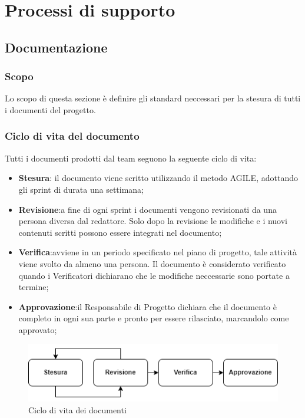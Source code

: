 \section{Processi di supporto}

\subsection{Documentazione}

\subsubsection{Scopo}
Lo scopo di questa sezione è definire gli standard neccessari per la stesura di tutti i documenti del progetto.

\subsubsection{Ciclo di vita del documento}
Tutti i documenti prodotti dal team seguono la seguente ciclo di vita:
\begin{itemize}
    \item \textbf{Stesura}: il documento viene scritto utilizzando il metodo AGILE, adottando gli sprint di durata una settimana; 
    \item \textbf{Revisione}:a fine di ogni sprint i documenti vengono revisionati da una persona diversa dal redattore. Solo dopo la revisione
				le modifiche e i nuovi contenuti scritti possono essere integrati nel documento;
    \item \textbf{Verifica}:avviene in un periodo specificato nel piano di progetto, tale attività viene svolto da almeno una persona. Il documento
				è considerato verificato quando i Verificatori dichiarano che le modifiche neccessarie sono portate a termine;
    \item \textbf{Approvazione}:il Responsabile di Progetto dichiara che il documento è completo in ogni sua
					parte e pronto per essere rilasciato, marcandolo come approvato;
\end{itemize}
\begin{figure}[H]
    \centering
    \includegraphics[scale=0.8]{img/ciclo_di_vita.png}
    \caption{Ciclo di vita dei documenti}
\end{figure}

